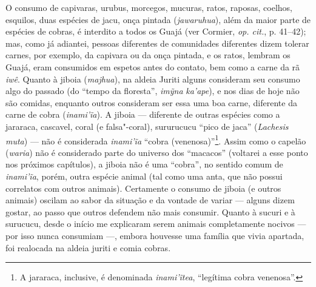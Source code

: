 O consumo de capivaras, urubus, morcegos, mucuras, ratos, raposas,
coelhos, esquilos, duas espécies de jacu, onça pintada
(\emph{jawaruhua}), além da maior parte de espécies de cobras, é
interdito a todos os Guajá (ver Cormier, \emph{op. cit.}, p. 41--42); mas, como
já adiantei, pessoas diferentes de comunidades diferentes dizem tolerar
carnes, por exemplo, da capivara ou da onça pintada, e os ratos, lembram
os Guajá, eram consumidos em espetos antes do contato, bem como a carne
da rã \emph{iwê}. Quanto à jiboia (\emph{majhua}), na aldeia Juriti
alguns consideram seu consumo algo do passado (do ``tempo da floresta'',
\emph{imỹna} \emph{ka'ape}), e nos dias de hoje não são comidas,
enquanto outros consideram ser essa uma boa carne, diferente da carne de
cobra (\emph{inami'ĩa}). A jiboia --- diferente de outras espécies como a
jararaca, cascavel, coral (e falsa"-coral), sururucucu ``pico de jaca''
(\emph{Lachesis muta}) --- não é considerada \emph{inami'ĩa} ``cobra
(venenosa)''\footnote{A jararaca, inclusive, é denominada
  \emph{inami'ĩtea}, ``legítima cobra venenosa''.}. Assim como o capelão
(\emph{waria}) não é considerado parte do universo dos ``macacos''
(voltarei a esse ponto nos próximos capítulos), a jiboia não é uma
``cobra'', no sentido comum de \emph{inami'ĩa}, porém, outra espécie
animal (tal como uma anta, que não possui correlatos com outros
animais). Certamente o consumo de jiboia (e outros animais) oscilam ao
sabor da situação e da vontade de variar --- alguns dizem gostar, ao passo
que outros defendem não mais consumir. Quanto à sucuri e à surucucu,
desde o início me explicaram serem animais completamente nocivos --- por
isso nunca consumiam ---, embora houvesse uma família que vivia apartada,
foi realocada na aldeia juriti e comia cobras.

